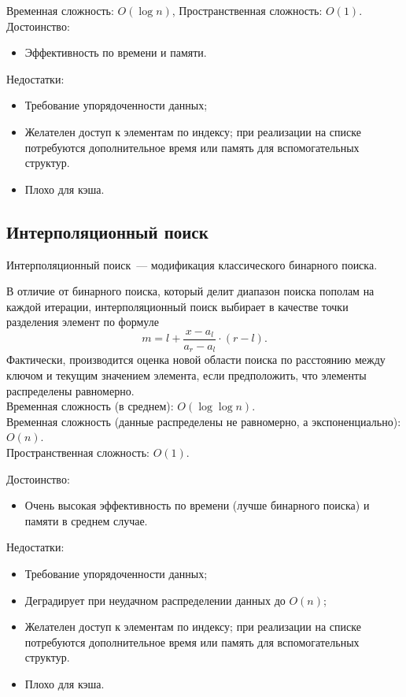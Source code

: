 Временная сложность: $O(\log n)$, Пространственная сложность: $O(1)$.
Достоинство:
\begin{itemize}
  \item Эффективность по времени и памяти.
\end{itemize}
Недостатки:
\begin{itemize}
  \item Требование упорядоченности данных;
  \item Желателен доступ к элементам по индексу; при реализации на
  списке потребуются дополнительное время или память для
  вспомогательных структур.
  \item Плохо для кэша.
\end{itemize}


\subsection{Интерполяционный поиск}
Интерполяционный поиск~--- модификация классического бинарного поиска.

В отличие от бинарного поиска, который делит диапазон поиска пополам на каждой итерации,
интерполяционный поиск выбирает в качестве точки разделения элемент по формуле $$m = l + \frac{x - a_l}{a_r-a_l} \cdot (r-l).$$
Фактически, производится оценка новой области поиска по расстоянию между ключом и текущим значением элемента, если предположить, что
элементы распределены равномерно.\\
Временная сложность (в среднем): $O(\log{\log{n}})$.\\
Временная сложность (данные распределены не равномерно, а экспоненциально): $O(n)$.\\
Пространственная сложность: $O(1)$.

Достоинство:
\begin{itemize}
  \item Очень высокая эффективность по времени (лучше бинарного поиска) и памяти  в среднем случае.
\end{itemize}
Недостатки:
\begin{itemize}
  \item Требование упорядоченности данных; 
  \item Деградирует при неудачном распределении данных до $O(n)$;
  \item Желателен доступ к элементам по индексу; при реализации на
  списке потребуются дополнительное время или память для
  вспомогательных структур.
  \item Плохо для кэша.
\end{itemize}

